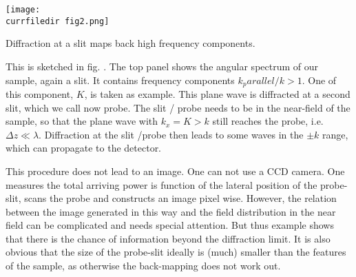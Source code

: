 \begin{marginfigure}
    \texttt{[image: \\currfiledir fig2.png]}
    \caption{Diffraction at a slit maps back high frequency components.\label{fig:micro_snom_principle}}
\end{marginfigure}


This is sketched in fig. \label{fig:micro_snom_principle}. The top panel shows the angular spectrum of our sample, again a slit. It contains frequency components $k_parallel / k > 1$. One of this component, $K$, is taken as example. This plane wave is diffracted at a second slit, which we call now probe. The slit / probe needs to be in the near-field of the sample, so that the plane wave with $k_x = K > k$ still reaches the probe, i.e. $\Delta z \ll \lambda$. Diffraction at the slit /probe then leads to some waves in the $\pm k$ range, which can propagate to the detector.

This procedure does not lead to an image. One can not use a CCD camera. One measures the total arriving power is function of the lateral position of the probe-slit, scans the probe and constructs an image pixel wise. However, the relation between the image generated in this way and the field distribution in the near field can be complicated and needs special attention. But thus example shows that there is the chance of information beyond the diffraction limit. It is also obvious that the size of the probe-slit ideally is  (much) smaller than the features of the sample, as otherwise the back-mapping does not work out.






\printbibliography[segment=\therefsegment,heading=subbibliography]

